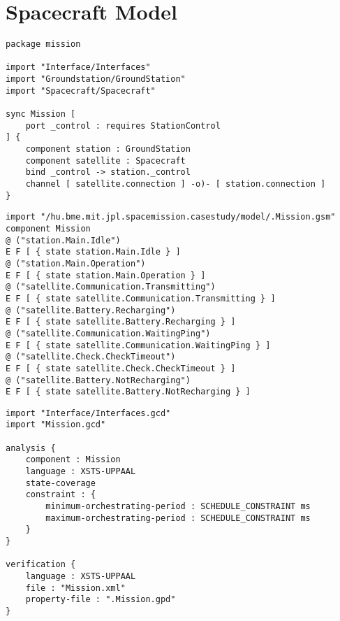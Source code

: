 \clearpage\section{Spacecraft Model}\label{sec:spacecraft-model}

\begin{lstlisting}[language=statechart, caption={The wrapper synchronous component.}]
package mission

import "Interface/Interfaces"
import "Groundstation/GroundStation"
import "Spacecraft/Spacecraft"

sync Mission [
	port _control : requires StationControl
] {
	component station : GroundStation
	component satellite : Spacecraft
	bind _control -> station._control
	channel [ satellite.connection ] -o)- [ station.connection ]
}
\end{lstlisting}

\begin{lstlisting}[language=statechart, caption={The reachability properties generated by Gamma.}]
import "/hu.bme.mit.jpl.spacemission.casestudy/model/.Mission.gsm"
component Mission
@ ("station.Main.Idle")
E F [ { state station.Main.Idle } ]
@ ("station.Main.Operation")
E F [ { state station.Main.Operation } ]
@ ("satellite.Communication.Transmitting")
E F [ { state satellite.Communication.Transmitting } ]
@ ("satellite.Battery.Recharging")
E F [ { state satellite.Battery.Recharging } ]
@ ("satellite.Communication.WaitingPing")
E F [ { state satellite.Communication.WaitingPing } ]
@ ("satellite.Check.CheckTimeout")
E F [ { state satellite.Check.CheckTimeout } ]
@ ("satellite.Battery.NotRecharging")
E F [ { state satellite.Battery.NotRecharging } ]
\end{lstlisting}

\begin{lstlisting}[language=statechart, caption={The definition of the run analysis and verification tasks.}]
import "Interface/Interfaces.gcd"
import "Mission.gcd"

analysis {
	component : Mission
	language : XSTS-UPPAAL
	state-coverage
	constraint : {
		minimum-orchestrating-period : SCHEDULE_CONSTRAINT ms
		maximum-orchestrating-period : SCHEDULE_CONSTRAINT ms
	}
}

verification {
	language : XSTS-UPPAAL
	file : "Mission.xml"
	property-file : ".Mission.gpd"
}
\end{lstlisting}

